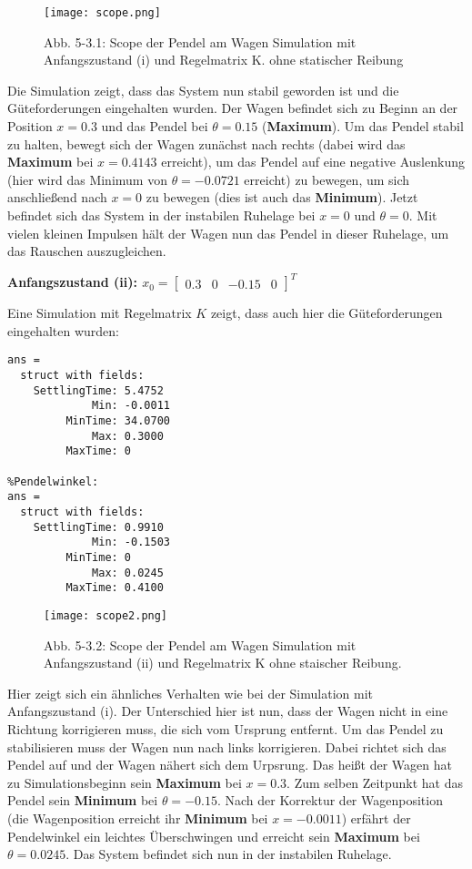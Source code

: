\documentclass[11pt]{scrartcl} %
\begin{document}
\begin{figure}[H]
	\centering
	\texttt{[image: scope.png]}
	\captionsetup{labelformat=empty}
	\caption{\small{Abb. 5-3.1: Scope der Pendel am Wagen Simulation mit Anfangszustand (i) und Regelmatrix K. ohne statischer Reibung}}
\end{figure}

Die Simulation zeigt, dass das System nun stabil geworden ist und die Güteforderungen eingehalten wurden. Der Wagen befindet sich zu Beginn an der Position $x=0.3$ und das Pendel bei $\theta=0.15$ (\textbf{Maximum}). Um das Pendel stabil zu halten, bewegt sich der Wagen zunächst nach rechts (dabei wird das \textbf{Maximum} bei $x=0.4143$ erreicht), um das Pendel auf eine negative Auslenkung (hier wird das Minimum von $\theta=-0.0721$ erreicht) zu bewegen, um sich anschließend nach $x=0$ zu bewegen (dies ist auch das \textbf{Minimum}). Jetzt befindet sich das System in der instabilen Ruhelage bei $x=0$ und $\theta=0$. Mit vielen kleinen Impulsen hält der Wagen nun das Pendel in dieser Ruhelage, um das Rauschen auszugleichen.

\pagebreak
\textbf{Anfangszustand (ii): $x_0 = \begin{bmatrix}
0.3 & 0 & -0.15 & 0
\end{bmatrix}^T$}

Eine Simulation mit Regelmatrix $K$ zeigt, dass auch hier die Güteforderungen eingehalten wurden:
\begin{Verbatim}[frame=single]
%Wagenposition:
ans = 
  struct with fields:
    SettlingTime: 5.4752
             Min: -0.0011
         MinTime: 34.0700
             Max: 0.3000
         MaxTime: 0

%Pendelwinkel:
ans = 
  struct with fields:
    SettlingTime: 0.9910
             Min: -0.1503
         MinTime: 0
             Max: 0.0245
         MaxTime: 0.4100
\end{Verbatim}
\begin{figure}[H]
	\centering
	\texttt{[image: scope2.png]}
	\captionsetup{labelformat=empty}
	\caption{\small{Abb. 5-3.2: Scope der Pendel am Wagen Simulation mit Anfangszustand (ii) und Regelmatrix K ohne staischer Reibung.}}
\end{figure}

Hier zeigt sich ein ähnliches Verhalten wie bei der Simulation mit Anfangszustand (i). Der Unterschied hier ist nun, dass der Wagen nicht in eine Richtung korrigieren muss, die sich vom Ursprung entfernt. Um das Pendel zu stabilisieren muss der Wagen nun nach links korrigieren. Dabei richtet sich das Pendel auf und der Wagen nähert sich dem Urpsrung. Das heißt der Wagen hat zu Simulationsbeginn sein \textbf{Maximum} bei $x=0.3$. Zum selben Zeitpunkt hat das Pendel sein \textbf{Minimum} bei $\theta=-0.15$. Nach der Korrektur der Wagenposition (die Wagenposition erreicht ihr \textbf{Minimum} bei $x=-0.0011$) erfährt der Pendelwinkel ein leichtes Überschwingen und erreicht sein \textbf{Maximum} bei $\theta=0.0245$. Das System befindet sich nun in der instabilen Ruhelage.
\end{document}
